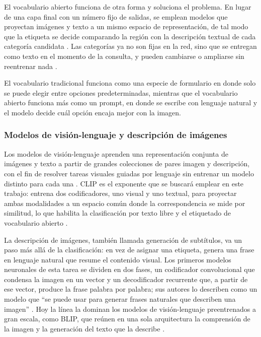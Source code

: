 \documentclass[12pt,onecolumn]{IEEEtran}
\begin{document}
El vocabulario abierto funciona de otra forma y soluciona el problema. En lugar de una capa final con un número fijo de salidas, se emplean modelos que proyectan imágenes y texto a un mismo espacio de representación, de tal modo que la etiqueta se decide comparando la región con la descripción textual de cada categoría candidata \cite{radford2021clip}. Las categorías ya no son fijas en la red, sino que se entregan como texto en el momento de la consulta, y pueden cambiarse o ampliarse sin reentrenar nada \cite{kombol2025trainingfree}.

El vocabulario tradicional funciona como una especie de formulario en donde solo se puede elegir entre opciones predeterminadas, mientras que el vocabulario abierto funciona más como un prompt, en donde se escribe con lenguaje natural y el modelo decide cuál opción encaja mejor con la imagen.

\subsubsection{Modelos de visión-lenguaje y descripción de imágenes}
Los modelos de visión-lenguaje aprenden una representación conjunta de imágenes y texto a partir de grandes colecciones de pares imagen y descripción, con el fin de resolver tareas visuales guiadas por lenguaje sin entrenar un modelo distinto para cada una \cite{zhang2024vlm}. CLIP es el exponente que se buscará emplear en este trabajo: entrena dos codificadores, uno visual y uno textual, para proyectar ambas modalidades a un espacio común donde la correspondencia se mide por similitud, lo que habilita la clasificación por texto libre y el etiquetado de vocabulario abierto \cite{radford2021clip}.

La descripción de imágenes, también llamada generación de subtítulos, va un paso más allá de la clasificación: en vez de asignar una etiqueta, genera una frase en lenguaje natural que resume el contenido visual. Los primeros modelos neuronales de esta tarea se dividen en dos fases, un codificador convolucional que condensa la imagen en un vector y un decodificador recurrente que, a partir de ese vector, produce la frase palabra por palabra; sus autores lo describen como un modelo que ``se puede usar para generar frases naturales que describen una imagen'' \cite{vinyals2015show}. Hoy la línea la dominan los modelos de visión-lenguaje preentrenados a gran escala, como BLIP, que reúnen en una sola arquitectura la comprensión de la imagen y la generación del texto que la describe \cite{li2022blip}.
\end{document}
